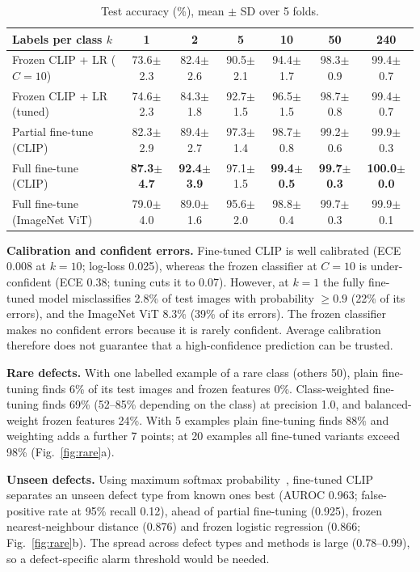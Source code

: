\documentclass[11pt,a4paper]{article}
\begin{document}
\begin{table}[t]
\centering\small
\caption{Test accuracy (\%), mean $\pm$ SD over 5 folds.}\label{tab:acc}
\begin{tabular}{@{}lcccccc@{}}
\toprule
Labels per class $k$ & 1 & 2 & 5 & 10 & 50 & 240\\
\midrule
Frozen CLIP + LR ($C{=}10$) & 73.6$\pm$2.3 & 82.4$\pm$2.6 & 90.5$\pm$2.1 & 94.4$\pm$1.7 & 98.3$\pm$0.9 & 99.4$\pm$0.7\\
Frozen CLIP + LR (tuned) & 74.6$\pm$2.3 & 84.3$\pm$1.8 & 92.7$\pm$1.5 & 96.5$\pm$1.5 & 98.7$\pm$0.8 & 99.4$\pm$0.7\\
Partial fine-tune (CLIP) & 82.3$\pm$2.9 & 89.4$\pm$2.7 & 97.3$\pm$1.4 & 98.7$\pm$0.8 & 99.2$\pm$0.6 & 99.9$\pm$0.3\\
Full fine-tune (CLIP) & \textbf{87.3$\pm$4.7} & \textbf{92.4$\pm$3.9} & 97.1$\pm$1.5 & \textbf{99.4$\pm$0.5} & \textbf{99.7$\pm$0.3} & \textbf{100.0$\pm$0.0}\\
Full fine-tune (ImageNet ViT) & 79.0$\pm$4.0 & 89.0$\pm$1.6 & 95.6$\pm$2.0 & 98.8$\pm$0.4 & 99.7$\pm$0.3 & 99.9$\pm$0.1\\
\bottomrule
\end{tabular}
\end{table}

\textbf{Calibration and confident errors.} Fine-tuned CLIP is well calibrated (ECE 0.008 at $k=10$; log-loss 0.025), whereas the frozen classifier at $C=10$ is under-confident (ECE 0.38; tuning cuts it to 0.07). However, at $k=1$ the fully fine-tuned model misclassifies 2.8\% of test images with probability $\ge0.9$ (22\% of its errors), and the ImageNet ViT 8.3\% (39\% of its errors). The frozen classifier makes no confident errors because it is rarely confident. Average calibration therefore does not guarantee that a high-confidence prediction can be trusted.

\textbf{Rare defects.} With one labelled example of a rare class (others 50), plain fine-tuning finds 6\% of its test images and frozen features 0\%. Class-weighted fine-tuning finds 69\% (52--85\% depending on the class) at precision 1.0, and balanced-weight frozen features 24\%. With 5 examples plain fine-tuning finds 88\% and weighting adds a further 7 points; at 20 examples all fine-tuned variants exceed 98\% (Fig.~\ref{fig:rare}a).

\textbf{Unseen defects.} Using maximum softmax probability~\cite{hendrycksgimpel}, fine-tuned CLIP separates an unseen defect type from known ones best (AUROC 0.963; false-positive rate at 95\% recall 0.12), ahead of partial fine-tuning (0.925), frozen nearest-neighbour distance (0.876) and frozen logistic regression (0.866; Fig.~\ref{fig:rare}b). The spread across defect types and methods is large (0.78--0.99), so a defect-specific alarm threshold would be needed.
\end{document}
